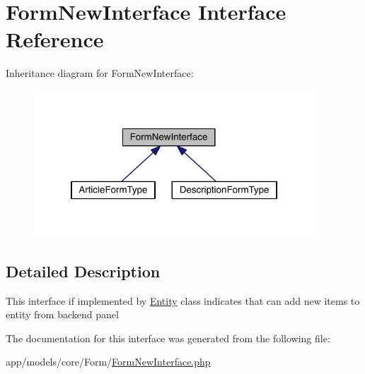 \hypertarget{interfaceapp_1_1models_1_1core_1_1_form_1_1_form_new_interface}{\section{Form\-New\-Interface Interface Reference}
\label{interfaceapp_1_1models_1_1core_1_1_form_1_1_form_new_interface}
}


Inheritance diagram for Form\-New\-Interface\-:
\nopagebreak
\begin{figure}[H]
\begin{center}
\leavevmode
\includegraphics[width=297pt]{interfaceapp_1_1models_1_1core_1_1_form_1_1_form_new_interface__inherit__graph}
\end{center}
\end{figure}


\subsection{Detailed Description}
This interface if implemented by \hyperlink{namespace_entity}{Entity} class indicates that can add new items to entity from backend panel 

The documentation for this interface was generated from the following file\-:\begin{DoxyCompactItemize}
\item 
app/models/core/\-Form/\hyperlink{_form_new_interface_8php}{Form\-New\-Interface.\-php}\end{DoxyCompactItemize}
